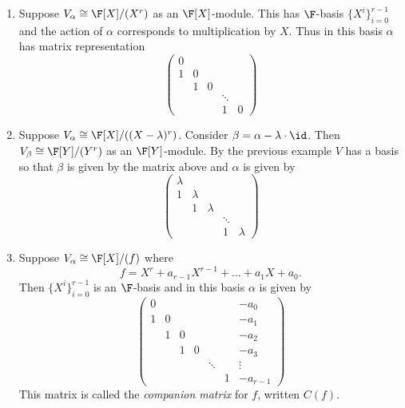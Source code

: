 \documentclass[a4paper]{article}
\begin{document}
\begin{eg}\leavevmode
  \begin{enumerate}
  \item Suppose \(V_\alpha \cong \F[X]/(X^r)\) as an \(\F[X]\)-module. This has \(\F\)-basis \(\{X^i\}_{i = 0}^{r - 1}\) and the action of \(\alpha\) corresponds to multiplication by \(X\). Thus in this basis \(\alpha\) has matrix representation
    \[
      \begin{pmatrix}
        0 \\
        1 & 0 \\
        & 1 & 0 \\
        & & & \ddots \\
        & & & 1 & 0
      \end{pmatrix}
    \]
  \item Suppose \(V_\alpha \cong \F[X]/((X - \lambda)^r)\). Consider \(\beta = \alpha - \lambda \cdot \id\). Then \(V_\beta \cong \F[Y]/(Y^r)\) as an \(\F[Y]\)-module. By the previous example \(V\) has a basis so that \(\beta\) is given by the matrix above and \(\alpha\) is given by
    \[
      \begin{pmatrix}
        \lambda \\
        1 & \lambda \\
        & 1 & \lambda \\
        & & & \ddots \\
        & & & 1 & \lambda
      \end{pmatrix}
    \]
  \item Suppose \(V_\alpha \cong \F[X]/(f)\) where
    \[
      f = X^r + a_{r - 1}X^{r - 1} + \dots + a_1X + a_0.
    \]
    Then \(\{X^i\}_{i = 0}^{r - 1}\) is an \(\F\)-basis and in this basis \(\alpha\) is given by
    \[
      \begin{pmatrix}
        0 & & & & & & -a_0 \\
        1 & 0 & & & & & -a_1 \\
        & 1 & 0 & & & & -a_2 \\
        & & 1 & 0 & & & -a_3 \\
        & & & & \ddots & & \vdots \\
        & & & & & 1 & -a_{r - 1}
      \end{pmatrix}
    \]
    This matrix is called the \emph{companion matrix} for \(f\), written \(C(f)\).
  \end{enumerate}
\end{eg}
\end{document}
